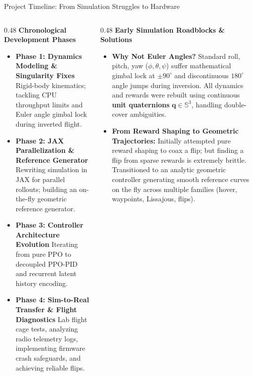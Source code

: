 \documentclass[aspectratio=169,9pt]{beamer}
\begin{document}
\begin{frame}{Project Timeline: From Simulation Struggles to Hardware}
  \begin{columns}[onlytextwidth,T]
    \begin{column}{0.48\textwidth}
      \textbf{Chronological Development Phases}
      \begin{itemize}\itemsep3pt
        \item \textbf{Phase 1: Dynamics Modeling \& Singularity Fixes}
        Rigid-body kinematics; tackling CPU throughput limits and Euler angle gimbal lock during inverted flight.
        \item \textbf{Phase 2: JAX Parallelization \& Reference Generator}
        Rewriting simulation in JAX for parallel rollouts; building an on-the-fly geometric reference generator.
        \item \textbf{Phase 3: Controller Architecture Evolution}
        Iterating from pure PPO to decoupled PPO-PID and recurrent latent history encoding.
        \item \textbf{Phase 4: Sim-to-Real Transfer \& Flight Diagnostics}
        Lab flight cage tests, analyzing radio telemetry logs, implementing firmware crash safeguards, and achieving reliable flips.
      \end{itemize}
    \end{column}
    
    \begin{column}{0.48\textwidth}
      \textbf{Early Simulation Roadblocks \& Solutions}
      \begin{itemize}\itemsep3pt
        \item \textbf{Why Not Euler Angles?}
        Standard roll, pitch, yaw ($\phi, \theta, \psi$) suffer mathematical gimbal lock at $\pm 90^\circ$ and discontinuous $180^\circ$ angle jumps during inversion. All dynamics and rewards were rebuilt using continuous \textbf{unit quaternions} $\mathbf{q} \in \mathbb{S}^3$, handling double-cover ambiguities.
        \item \textbf{From Reward Shaping to Geometric Trajectories:}
        Initially attempted pure reward shaping to coax a flip; but finding a flip from sparse rewards is extremely brittle. Transitioned to an analytic geometric controller generating smooth reference curves on the fly across multiple families (hover, waypoints, Lissajous, flips).
      \end{itemize}
    \end{column}
  \end{columns}
\end{frame}
\end{document}
